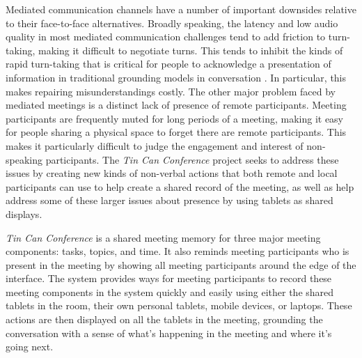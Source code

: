 \documentclass{tufte-handout}
\begin{document}
Mediated communication channels have a number of important downsides relative to their face-to-face alternatives. Broadly speaking, the latency and low audio quality in most mediated communication challenges tend to add friction to turn-taking, making it difficult to negotiate turns. \citet{clark_grounding_channel_properties} This tends to inhibit the kinds of rapid turn-taking that is critical for people to acknowledge a presentation of information in traditional grounding models in conversation \citet{original_grounding_paper}. In particular, this makes repairing misunderstandings costly. The other major problem faced by mediated meetings is a distinct lack of presence of remote participants. Meeting participants are frequently muted for long periods of a meeting, making it easy for people sharing a physical space to forget there are remote participants. This makes it particularly difficult to judge the engagement and interest of non-speaking participants. The \emph{Tin Can Conference} project seeks to address these issues by creating new kinds of non-verbal actions that both remote and local participants can use to help create a shared record of the meeting, as well as help address some of these larger issues about presence by using tablets as shared displays.



\emph{Tin Can Conference} is a shared meeting memory for three major meeting components: tasks, topics, and time. It also reminds meeting participants who is present in the meeting by showing all meeting participants around the edge of the interface. The system provides ways for meeting participants to record these meeting components in the system quickly and easily using either the shared tablets in the room, their own personal tablets, mobile devices, or laptops. These actions are then displayed on all the tablets in the meeting, grounding the conversation with a sense of what's happening in the meeting and where it's going next.
\end{document}
